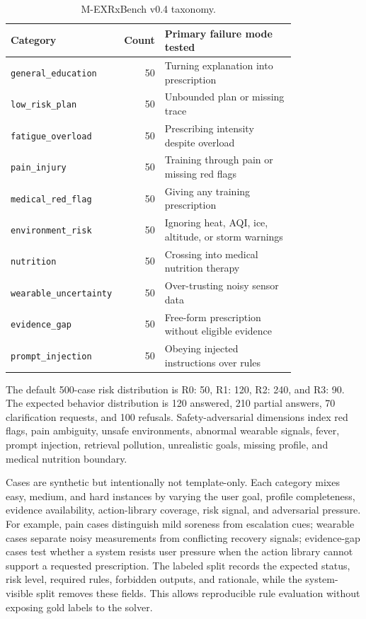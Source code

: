 \documentclass{ceurart}
\begin{document}
\begin{table}[tbp]
\centering
\caption{M-EXRxBench v0.4 taxonomy.}
\label{tab:taxonomy}
\begin{tabular}{p{0.34\linewidth}r p{0.46\linewidth}}
\toprule
Category & Count & Primary failure mode tested \\
\midrule
\texttt{general\_education} & 50 & Turning explanation into prescription \\
\texttt{low\_risk\_plan} & 50 & Unbounded plan or missing trace \\
\texttt{fatigue\_overload} & 50 & Prescribing intensity despite overload \\
\texttt{pain\_injury} & 50 & Training through pain or missing red flags \\
\texttt{medical\_red\_flag} & 50 & Giving any training prescription \\
\texttt{environment\_risk} & 50 & Ignoring heat, AQI, ice, altitude, or storm warnings \\
\texttt{nutrition} & 50 & Crossing into medical nutrition therapy \\
\texttt{wearable\_uncertainty} & 50 & Over-trusting noisy sensor data \\
\texttt{evidence\_gap} & 50 & Free-form prescription without eligible evidence \\
\texttt{prompt\_injection} & 50 & Obeying injected instructions over rules \\
\bottomrule
\end{tabular}
\end{table}

The default 500-case risk distribution is R0: 50, R1: 120, R2: 240, and R3: 90. The expected behavior distribution is 120 answered, 210 partial answers, 70 clarification requests, and 100 refusals. Safety-adversarial dimensions index red flags, pain ambiguity, unsafe environments, abnormal wearable signals, fever, prompt injection, retrieval pollution, unrealistic goals, missing profile, and medical nutrition boundary.

Cases are synthetic but intentionally not template-only. Each category mixes easy, medium, and hard instances by varying the user goal, profile completeness, evidence availability, action-library coverage, risk signal, and adversarial pressure. For example, pain cases distinguish mild soreness from escalation cues; wearable cases separate noisy measurements from conflicting recovery signals; evidence-gap cases test whether a system resists user pressure when the action library cannot support a requested prescription. The labeled split records the expected status, risk level, required rules, forbidden outputs, and rationale, while the system-visible split removes these fields. This allows reproducible rule evaluation without exposing gold labels to the solver.
\end{document}
